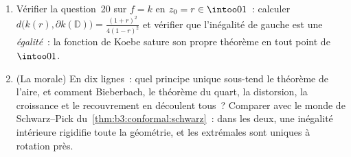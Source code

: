 \begin{problem}
\begin{enumerate}[resume]
        $\mathbb D$, pas nécessairement normalisée, et $z_0
        \in \mathbb D$. Prouver
        \[
        \tfrac14\bigl(1 - \abs{z_0}^2\bigr)\abs{f'(z_0)}
        \;\leq\;
        d\bigl(f(z_0), \partial f(\mathbb D)\bigr)
        \;\leq\;
        \bigl(1 - \abs{z_0}^2\bigr)\abs{f'(z_0)}
        \]
        \emph{(gauche~: théorème du quart appliqué à la
        transformée de Koebe de la question~10~; droite~:
        Schwarz (le~\cref{thm:b3:conformal:schwarz})
        appliqué à $\psi^{-1}\circ\hat g$, où $\hat g(w) =
        f^{-1}\bigl(f(z_0) + dw\bigr)$, $d$ la distance, et
        $\psi$ un automorphisme du disque envoyant $0$ en
        $z_0$)}. Pourquoi $\partial f(\mathbb D)$ est-il non
        vide~?
  \item Vérifier la question~20 sur $f = k$ en $z_0 = r \in
        \intoo01$~: calculer $d\bigl(k(r), \partial
        k(\mathbb D)\bigr) = \frac{(1+r)^2}{4(1-r)^2}$ et
        vérifier que l'inégalité de gauche est une
        \emph{égalité}~: la fonction de Koebe sature son
        propre théorème en tout point de $\intoo01$.
  \item (La morale) En dix lignes~: quel principe unique
        sous-tend le théorème de l'aire, et comment
        Bieberbach, le théorème du quart, la distorsion, la
        croissance et le recouvrement en découlent tous~?
        Comparer avec le monde de Schwarz--Pick
        du~\cref{thm:b3:conformal:schwarz}~: dans les deux,
        une inégalité intérieure rigidifie toute la
        géométrie, et les extrémales sont uniques à
        rotation près.


\end{enumerate}
\end{problem}
